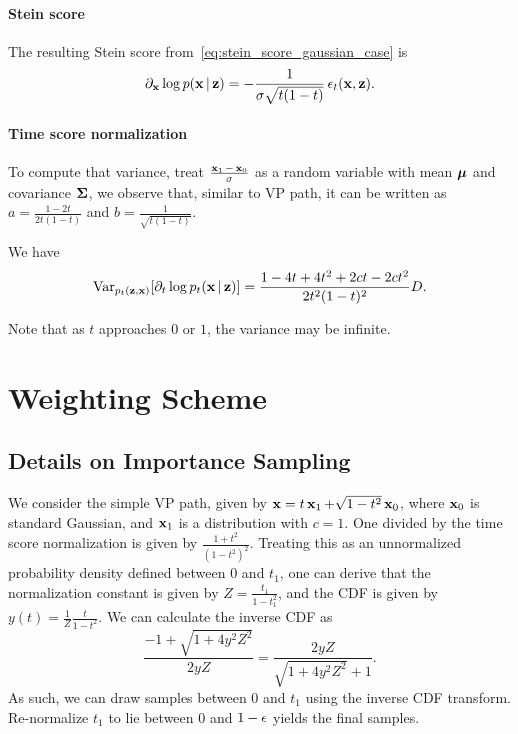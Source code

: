 \paragraph{Stein score}
The resulting Stein score from~\eqref{eq:stein_score_gaussian_case} is
\begin{align}
    \partial_{\operatorname{\mathbf{x}}}\log p(\operatorname{\mathbf{x}}|\operatorname{\mathbf{z}}) 
    =
    -\frac{1}{\sigma\sqrt{t(1-t)}}\operatorname{\mathbf{\epsilon}}_{t}(\operatorname{\mathbf{x}},\operatorname{\mathbf{z}}).
\end{align}

\paragraph{Time score normalization}
To compute that variance, treat $\frac{\operatorname{\mathbf{x}}_{1}-\operatorname{\mathbf{x}}_{0}}{\sigma}$ as a random variable with mean $\operatorname{\bm{\mu}}$ and covariance $\operatorname{\mathbf{\Sigma}}$, we observe that, similar to VP path, it can be written as $a=\frac{1-2t}{2t(1-t)}$ and $b=\frac{1}{\sqrt{t(1-t)}}$.

We have
\begin{align}
    \mathrm{Var}_{p_t(\operatorname{\mathbf{z}}, \operatorname{\mathbf{x}})} [\partial_{t}\log p_{t}(\operatorname{\mathbf{x}}|\operatorname{\mathbf{z}})]
    =     
    \frac{1-4t+4t^{2}+2ct-2ct^{2}}{2t^{2}(1-t)^{2}}D.
\end{align}

Note that as $t$ approaches $0$ or $1$, the variance may be infinite. 







\newpage
\section{Weighting Scheme}
\label{app:sec:weighting}









\subsection{Details on Importance Sampling}
\label{app:sec:importance-sampling}

We consider the simple VP path, given by $\operatorname{\mathbf{x}} = t\operatorname{\mathbf{x}}_{1} + \sqrt{1-t^{2}}\operatorname{\mathbf{x}}_{0}$, where $\operatorname{\mathbf{x}}_{0}$ is standard Gaussian, and $\operatorname{\mathbf{x}}_{1}$ is a distribution with $c=1$. One divided by the time score normalization is given by $\frac{1+t^{2}}{\left(1-t^{2}\right)^{2}}$. Treating this as an unnormalized probability density defined between $0$ and $t_{1}$, one can derive that the normalization constant is given by $Z=\frac{t_{1}}{1-t_{1}^{2}}$, and the CDF is given by $y(t) = \frac{1}{Z}\frac{t}{1-t^{2}}$. We can calculate the inverse CDF as
\begin{equation}
\frac{-1+\sqrt{1+4y^{2}Z^{2}}}{2yZ} = \frac{2yZ}{\sqrt{1+4y^{2}Z^{2}}+1}.
\end{equation}
As such, we can draw samples between $0$ and $t_{1}$ using the inverse CDF transform. Re-normalize $t_{1}$ to lie between $0$ and $1-{\epsilon}$ yields the final samples.

